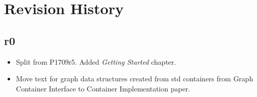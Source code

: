 \section{Revision History}

\subsection*{\paperno r0}

\begin{itemize}
      \item Split from P1709r5. Added \textit{Getting Started} chapter.
      \item Move text for graph data structures created from std containers from Graph Container Interface to 
            Container Implementation paper.
\end{itemize}
